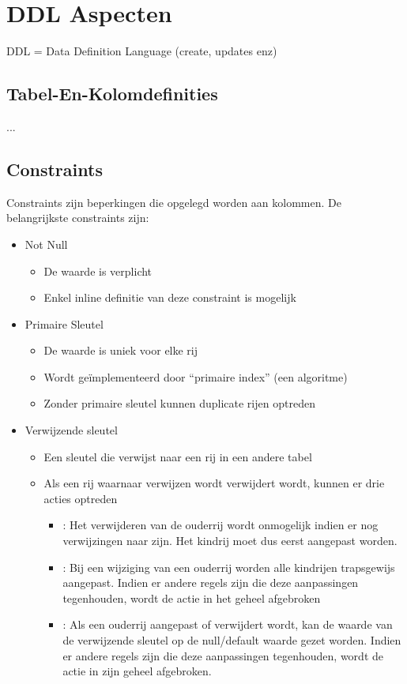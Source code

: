 \documentclass{article}
\begin{document}
\section{DDL Aspecten}
DDL = Data Definition Language (create, updates enz)
\subsection{Tabel-En-Kolomdefinities}
...
\subsection{Constraints}
Constraints zijn beperkingen die opgelegd worden aan kolommen.
De belangrijkste constraints zijn:
\begin{itemize}
\item {Not Null
    \begin{itemize}
    \item {De waarde is verplicht}
    \item {Enkel inline definitie van deze constraint is mogelijk}
    \end{itemize}
  }
\item {Primaire Sleutel
    \begin{itemize}
    \item {De waarde is uniek voor elke rij}
    \item {Wordt geïmplementeerd door ``primaire index'' (een algoritme)}
      \item {Zonder primaire sleutel kunnen duplicate rijen optreden}
    \end{itemize}
  }
\item {Verwijzende sleutel
    \begin{itemize}
    \item {Een sleutel die verwijst naar een rij in een andere tabel}
    \item {Als een rij waarnaar verwijzen wordt verwijdert wordt, kunnen er drie acties optreden
        \begin{itemize}
        \item {: Het verwijderen van de ouderrij wordt onmogelijk indien er nog verwijzingen naar zijn. Het kindrij moet dus eerst aangepast worden.}
        \item {: Bij een wijziging van een ouderrij worden alle kindrijen trapsgewijs aangepast. Indien er andere regels zijn die deze aanpassingen tegenhouden, wordt de actie in het geheel afgebroken}
         \item {: Als een ouderrij aangepast of verwijdert wordt, kan de waarde van de verwijzende sleutel op de null/default waarde gezet worden. Indien er andere regels zijn die deze aanpassingen tegenhouden, wordt de actie in zijn geheel afgebroken.}
        \end{itemize}}


\end{itemize}}
\end{itemize}
\end{document}
